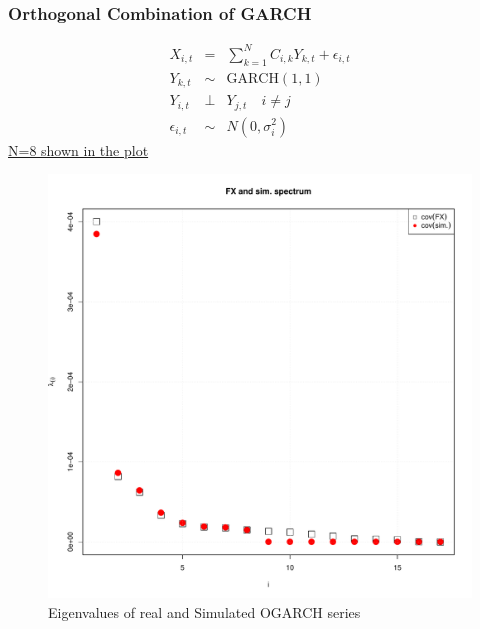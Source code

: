 \documentclass{beamer}
\begin{document}
\begin{frame}
  \frametitle{Orthogonal Combination of GARCH}
  \begin{minipage}{0.6\linewidth}
    \begin{scriptsize}
      \begin{eqnarray*}
        X_{i, t} &=& \sum_{k=1}^N C_{i,k} Y_{k, t} + \epsilon_{i, t} \\
        Y_{k, t} &\sim& \text{GARCH}(1,1) \\
        Y_{i, t} &\bot& Y_{j, t} \quad i \neq j\\
        \epsilon_{i,t} &\sim& N(0, \sigma_i^2)
      \end{eqnarray*}
      \underline{N=8 shown in the plot}
    \end{scriptsize}
  \end{minipage}\hfill
  \begin{minipage}{0.4\linewidth}
    \begin{figure}[htb!]
      \centering
      \includegraphics[width=1.0\linewidth]{FX_OGARCH_eigenvalues.pdf}
      \caption{\scriptsize Eigenvalues of real and Simulated OGARCH series}
    \end{figure}
  \end{minipage}
\end{frame}
\end{document}
